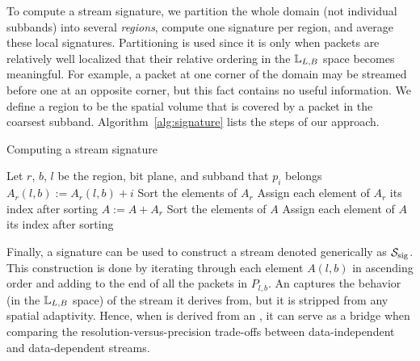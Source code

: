 To compute a stream signature, we partition the whole domain (not individual subbands) into several
\emph{regions}, compute one signature per region, and average these local signatures. Partitioning
is used since it is only when packets are relatively well localized that their relative ordering in
the ${\mathbb L}_{L,B}$ space becomes meaningful. For example, a packet at one corner of the domain may
be streamed before one at an opposite corner, but this fact contains no useful information. We
define a region to be the spatial volume that is covered by a packet in the coarsest subband.
Algorithm~\ref{alg:signature} lists the steps of our approach.

\begin{algorithm}[h]
  \caption{Computing a stream signature}
  \begin{algorithmic}[1]
			\State Let $r$, $b$, $l$ be the region, bit plane, and subband that $p_i$ belongs
			\State $A_r(l,b) := A_r(l,b)+i$
		\EndFor
			\State Sort the elements of $A_r$
			\State Assign each element of $A_r$ its index after sorting
			\State $A := A+A_r$
		\EndFor
		\State Sort the elements of $A$
		\State Assign each element of $A$ its index after sorting
	\end{algorithmic}
	\label{alg:signature}
\end{algorithm}

Finally, a signature can be used to construct a stream denoted generically as $\ssig$. This
construction is done by iterating through each element $A(l,b)$ in ascending order and adding to the
end of \ssig all the packets in $P_{l,b}$. An \ssig captures the behavior (in the ${\mathbb L}_{L,B}$
space) of the stream it derives from, but it is stripped from any spatial adaptivity. Hence, when
\ssig is derived from an \sopt, it can serve as a bridge when comparing the
resolution-versus-precision trade-offs between data-independent and data-dependent streams.